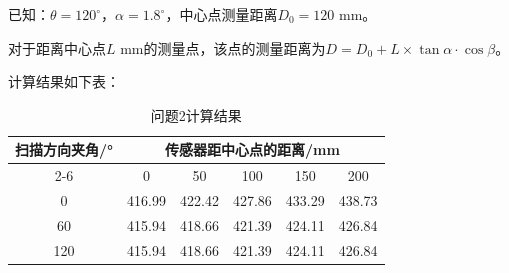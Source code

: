 \documentclass{article}
\begin{document}
	已知：\(\theta = 120^\circ\)，\(\alpha = 1.8^\circ\)，中心点测量距离\(D_0 = 120\) mm。
	
	对于距离中心点\(L\) mm的测量点，该点的测量距离为\(D = D_0 + L \times \tan \alpha \cdot \cos \beta\)。
	
	计算结果如下表：
	
	\begin{table}[h!]
		\centering
		\caption{问题2计算结果}
		\begin{tabular}{cccccc}
			\toprule
			\multirow{2}{*}{扫描方向夹角/°} & \multicolumn{5}{c}{传感器距中心点的距离/mm} \\
			\cmidrule(lr){2-6}
			& 0 & 50 & 100 & 150 & 200 \\
			\midrule
			0 & 416.99 & 422.42 & 427.86 & 433.29 & 438.73 \\
			60 & 415.94 & 418.66 & 421.39 & 424.11 & 426.84 \\
			120 & 415.94 & 418.66 & 421.39 & 424.11 & 426.84 \\
			\bottomrule
		\end{tabular}
	\end{table}
	
\end{document}
